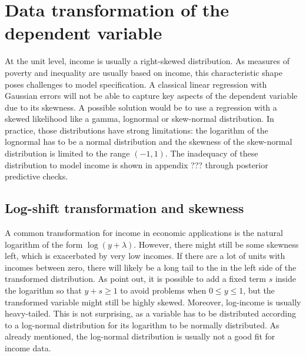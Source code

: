\section{Data transformation of the dependent variable}

At the unit level, income is usually a right-skewed distribution.
As measures of poverty and inequality are usually based on income, this characteristic shape poses challenges to model specification.
A classical linear regression with Gaussian errors will not be able to capture key aspects of the dependent variable due to its skewness.
A possible solution would be to use a regression with a skewed likelihood like a gamma, lognormal or skew-normal distribution.
In practice, those distributions have strong limitations: the logarithm of the lognormal has to be a normal distribution and the skewness of the skew-normal distribution is limited to the range $(-1, 1)$.
The inadequacy of these distribution to model income is shown in appendix ??? through posterior predictive checks.

\subsection{Log-shift transformation and skewness}
A common transformation for income in economic applications is the natural logarithm of the form $\log(y + \lambda)$. However, there might still be some skewness left, which is exacerbated by very low incomes.
If there are a lot of units with incomes between zero, there will likely be a long tail to the in the left side of the transformed distribution.
As \cite{rojas_perilla_data_2020} point out, it is possible to add a fixed term $s$ inside the logarithm so that $y+s \ge 1$ to avoid problems when $0 \le y \le 1$,
but the transformed variable might still be highly skewed.
Moreover, log-income is usually heavy-tailed.
This is not surprising, as a variable has to be distributed according to a log-normal distribution for its logarithm to be normally distributed.
As already mentioned, the log-normal distribution is usually not a good fit for income data.

